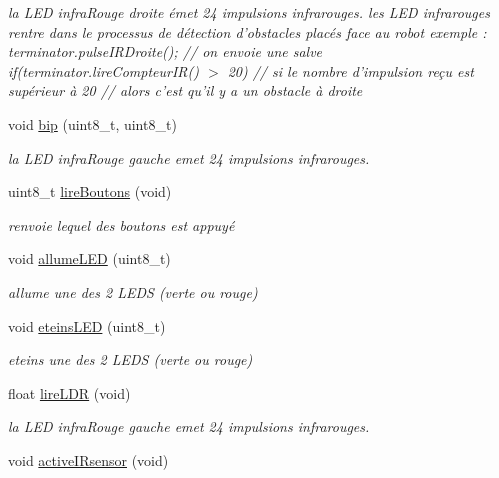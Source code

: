 \begin{DoxyCompactItemize}
\begin{DoxyCompactList}\small\item\em la L\-E\-D infra\-Rouge droite émet 24 impulsions infrarouges. les L\-E\-D infrarouges rentre dans le processus de détection d'obstacles placés face au robot exemple \-: terminator.\-pulse\-I\-R\-Droite(); // on envoie une salve if(terminator.\-lire\-Compteur\-I\-R() $>$ 20) // si le nombre d'impulsion reçu est supérieur à 20 // alors c'est qu'il y a un obstacle à droite \end{DoxyCompactList}\item 
void \hyperlink{class_d_f_robot2_w_d_a00c24b6d6be83474b4406c69601693e0}{bip} (uint8\-\_\-t, uint8\-\_\-t)
\begin{DoxyCompactList}\small\item\em la L\-E\-D infra\-Rouge gauche emet 24 impulsions infrarouges. \end{DoxyCompactList}\item 
uint8\-\_\-t \hyperlink{class_d_f_robot2_w_d_ace376163144bc9e11e27f705b99b1a33}{lire\-Boutons} (void)
\begin{DoxyCompactList}\small\item\em renvoie lequel des boutons est appuyé \end{DoxyCompactList}\item 
void \hyperlink{class_d_f_robot2_w_d_a30c9122f26bc5274b024acde8df84be8}{allume\-L\-E\-D} (uint8\-\_\-t)
\begin{DoxyCompactList}\small\item\em allume une des 2 L\-E\-D\-S (verte ou rouge) \end{DoxyCompactList}\item 
void \hyperlink{class_d_f_robot2_w_d_a0fa86146871d65dee79a75052ac8903f}{eteins\-L\-E\-D} (uint8\-\_\-t)
\begin{DoxyCompactList}\small\item\em eteins une des 2 L\-E\-D\-S (verte ou rouge) \end{DoxyCompactList}\item 
float \hyperlink{class_d_f_robot2_w_d_a52586a7e4f934475d35da9527d0ac197}{lire\-L\-D\-R} (void)
\begin{DoxyCompactList}\small\item\em la L\-E\-D infra\-Rouge gauche emet 24 impulsions infrarouges. \end{DoxyCompactList}\item 
\hypertarget{class_d_f_robot2_w_d_a660f6d3e3f0aad9732c6a68512fcb8b1}{void \hyperlink{class_d_f_robot2_w_d_a660f6d3e3f0aad9732c6a68512fcb8b1}{active\-I\-Rsensor} (void)}\label{class_d_f_robot2_w_d_a660f6d3e3f0aad9732c6a68512fcb8b1}


\end{DoxyCompactItemize}
